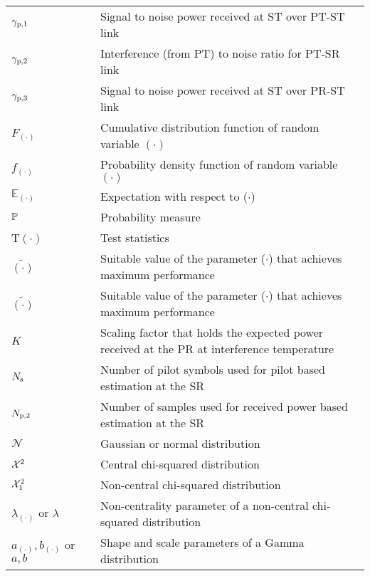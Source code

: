 \begin{longtable}{p{}p{}p{}}
	${\gamma}_{\text{p,1}}$  		& &		Signal to noise power received at ST over PT-ST link \\ 
        ${\gamma}_{\text{p,2}}$                & &             Interference (from PT) to noise ratio for PT-SR link \\
	${\gamma}_{\text{p,3}}$  		& &		Signal to noise power received at ST over PR-ST link \\ 
       $F_{(\cdot)}$            & &          Cumulative distribution function of random variable $(\cdot)$ \\
       $f_{(\cdot)}$            & &          Probability density function of random variable $(\cdot)$ \\
       $\mathbb E_{(\cdot)}$    & &		Expectation with respect to ($\cdot$) \\
       $\mathbb P$                     & &     	Probability measure \\
       T$(\cdot)$  	        & &          Test statistics \\
       $\tilde{(\cdot)}$        & &		Suitable value of the parameter ($\cdot$) that achieves maximum performance \\
       $\tilde{(\cdot)}$        & &		Suitable value of the parameter ($\cdot$) that achieves maximum performance \\
       $K$                      & &      Scaling factor that holds the expected power received at the PR at interference temperature  \\
       $N_{\text{s}}$                    & &      Number of pilot symbols used for pilot based estimation at the SR \\
       $N_{\text{p,2}}$                    & &      Number of samples used for received power based estimation at the SR \\
       $\mathcal N$                & &      Gaussian or normal distribution\\
       $\cchi2 $                & &      Central chi-squared distribution \\
       $\ncchi2$                & &      Non-central chi-squared distribution \\
       $\lambda_{(\cdot)}$ or $\lambda$  &     &       Non-centrality parameter of a non-central chi-squared distribution \\
       $a_{(\cdot)}, b_{(\cdot)}$ or $a, b$ &  &       Shape and scale parameters of a Gamma distribution \\


\end{longtable}

